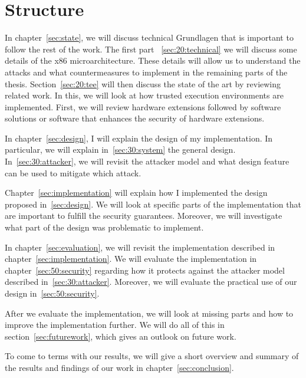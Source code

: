 \section{Structure}
\label{sec:10_structure}
In chapter~\ref{sec:state}, we will discuss technical Grundlagen that is
important to follow the rest of the work. The first part ~\ref{sec:20:technical}
we will discuss some details of the x86 microarchitecture. These details will
allow us to understand the attacks and what countermeasures to implement in the
remaining parts of the thesis. Section~\ref{sec:20:tee} will then discuss the
state of the art by reviewing related work. In this, we will look at how trusted
execution environments are implemented. First, we will review hardware
extensions followed by software solutions or software that enhances the security
of hardware extensions.

In chapter~\ref{sec:design}, I will explain the design of my implementation. In
particular, we will explain in~\ref{sec:30:system} the general design.
In~\ref{sec:30:attacker}, we will revisit the attacker model and what design
feature can be used to mitigate which attack.

Chapter~\ref{sec:implementation} will explain how I implemented the design
proposed in~\ref{sec:design}. We will look at specific parts of the
implementation that are important to fulfill the security guarantees. Moreover,
we will investigate what part of the design was problematic to implement.

In chapter~\ref{sec:evaluation}, we will revisit the implementation described in
chapter~\ref{sec:implementation}. We will evaluate the implementation in
chapter~\ref{sec:50:security} regarding how it protects against the attacker
model described in~\ref{sec:30:attacker}. Moreover, we will evaluate the
practical use of our design in~\ref{sec:50:security}.

After we evaluate the implementation, we will look at missing parts and how to
improve the implementation further. We will do all of this in
section~\ref{sec:futurework}, which gives an outlook on future work.

To come to terms with our results, we will give a short overview and summary of
the results and findings of our work in chapter~\ref{sec:conclusion}.
